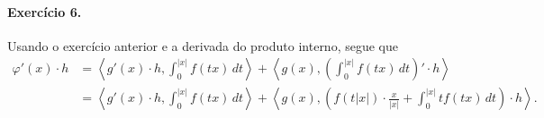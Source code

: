 \documentclass[12pt,a4paper]{article}
\begin{document}
\paragraph{Exercício 6.}
%
Usando o exercício anterior e a derivada do produto interno, segue que
%
\begin{align*}
    \varphi'(x)\cdot h 
    &=
    \left\langle
    g'(x)\cdot h, \int_0^{|x|} f(tx) \, dt
    \right\rangle
    +
    \left\langle
    g(x), \left( \int_0^{|x|} f(tx) \, dt \right)' \cdot h
    \right\rangle \\
    &=
    \left\langle
    g'(x)\cdot h, \int_0^{|x|} f(tx) \, dt
    \right\rangle
    +
    \left\langle
    g(x), \left( f(t|x|)\cdot\frac{x}{|x|} + \int_0^{|x|} tf(tx) \, dt \right) \cdot h
    \right\rangle.
\end{align*}
%
%
\end{document}
